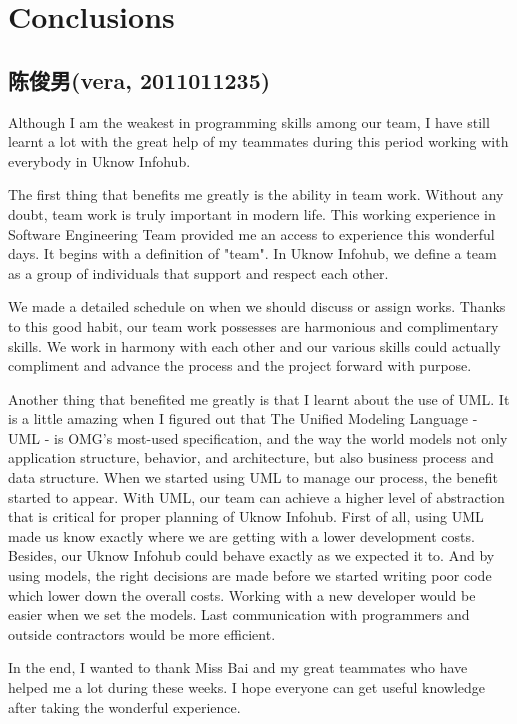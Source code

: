 \section{Conclusions}
\subsection{陈俊男(vera, 2011011235)}
  Although I am the weakest in programming skills among our team,
  I have still learnt a lot with the great help of my teammates during this period working with everybody in Uknow Infohub.

  The first thing that benefits me greatly is the ability in team work.
  Without any doubt, team work is truly important in modern life.
  This working experience in Software Engineering Team provided me an access to experience this wonderful days.
  It begins with a definition of "team".
  In Uknow Infohub, we define a team as a group of individuals that support and respect each other.

  We made a detailed schedule on when we should discuss or assign works.
  Thanks to this good habit, our team work possesses are harmonious and complimentary skills.
  We work in harmony with each other and our various skills could actually compliment and advance the process and the project forward with purpose.

  Another thing that benefited me greatly is that I learnt about the use of UML.
  It is a little amazing when I figured out that The Unified Modeling Language - UML - is OMG's most-used specification,
  and the way the world models not only application structure, behavior, and architecture,
  but also business process and data structure.
  When we started using UML to manage our process, the benefit started to appear.
  With UML, our team can achieve a higher level of abstraction that is critical for proper planning of Uknow Infohub.
  First of all, using UML made us know exactly where we are getting with a lower development costs.
  Besides, our Uknow Infohub could behave exactly as we expected it to.
  And by using models, the right decisions are made before we started writing poor code which lower down the overall costs.
  Working with a new developer would be easier when we set the models.
  Last communication with programmers and outside contractors would be more efficient.

  In the end, I wanted to thank Miss Bai and my great teammates who have helped me a lot during these weeks.
  I hope everyone can get useful knowledge after taking the wonderful experience.

